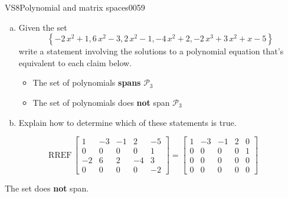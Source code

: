 \newpage




\begin{exercise}{VS8}{Polynomial and matrix spaces}{0059} 
\begin{exerciseStatement} 

\begin{enumerate}[(a)]
\item  

 Given the set \[\left\{ -2 \, x^{2} + 1 , 6 \, x^{2} - 3 , 2 \, x^{2} - 1 , -4 \, x^{2} + 2 , -2 \, x^{3} + 3 \, x^{2} + x - 5 \right\}\] write a statement involving the solutions to a polynomial equation that's equivalent to each claim below. 

 

\begin{itemize}
\item  

 The set of polynomials \textbf{spans} \(\mathcal{P}_3\) 

 
\item  

 The set of polynomials does \textbf{not} span \(\mathcal{P}_3\) 

 
\end{itemize}

     
\item  

 Explain how to determine which of these statements is true. 

 
\end{enumerate}

     \end{exerciseStatement}
 \begin{exerciseAnswer} 

 \[
\mathrm{RREF}\, \left[\begin{array}{ccccc}
1 & -3 & -1 & 2 & -5 \\
0 & 0 & 0 & 0 & 1 \\
-2 & 6 & 2 & -4 & 3 \\
0 & 0 & 0 & 0 & -2
\end{array}\right] = \left[\begin{array}{ccccc}
1 & -3 & -1 & 2 & 0 \\
0 & 0 & 0 & 0 & 1 \\
0 & 0 & 0 & 0 & 0 \\
0 & 0 & 0 & 0 & 0
\end{array}\right]
            \] 

 

 The set does \textbf{not} span. 

 \end{exerciseAnswer}
 \end{exercise}



